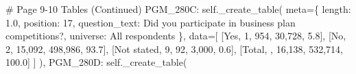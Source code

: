 \documentclass[
  11pt,
  a4paper,
]{article}
\newenvironment{Shaded}{\begin{snugshade}}{\end{snugshade}}
\newcommand{\CommentTok}[1]{\textcolor[rgb]{0.37,0.37,0.37}{#1}}
\newcommand{\NormalTok}[1]{\textcolor[rgb]{0.00,0.23,0.31}{#1}}
\newcommand{\OperatorTok}[1]{\textcolor[rgb]{0.37,0.37,0.37}{#1}}
\newcommand{\StringTok}[1]{\textcolor[rgb]{0.13,0.47,0.30}{#1}}
\newcommand{\VariableTok}[1]{\textcolor[rgb]{0.07,0.07,0.07}{#1}}
\begin{document}
\begin{Shaded}
\begin{Highlighting}[]
            \CommentTok{\# Page 9{-}10 Tables (Continued)}
            \StringTok{\textquotesingle{}PGM\_280C\textquotesingle{}}\NormalTok{: }\VariableTok{self}\NormalTok{.\_create\_table(}
\NormalTok{                meta}\OperatorTok{=}\NormalTok{\{}
                    \StringTok{\textquotesingle{}length\textquotesingle{}}\NormalTok{: }\StringTok{\textquotesingle{}1.0\textquotesingle{}}\NormalTok{, }\StringTok{\textquotesingle{}position\textquotesingle{}}\NormalTok{: }\StringTok{\textquotesingle{}17\textquotesingle{}}\NormalTok{,}
                    \StringTok{\textquotesingle{}question\_text\textquotesingle{}}\NormalTok{: }\StringTok{\textquotesingle{}Did you participate in business plan competitions?\textquotesingle{}}\NormalTok{,}
                    \StringTok{\textquotesingle{}universe\textquotesingle{}}\NormalTok{: }\StringTok{\textquotesingle{}All respondents\textquotesingle{}}
\NormalTok{                \},}
\NormalTok{                data}\OperatorTok{=}\NormalTok{[}
\NormalTok{                    [}\StringTok{\textquotesingle{}Yes\textquotesingle{}}\NormalTok{, }\StringTok{\textquotesingle{}1\textquotesingle{}}\NormalTok{, }\StringTok{\textquotesingle{}954\textquotesingle{}}\NormalTok{, }\StringTok{\textquotesingle{}30,728\textquotesingle{}}\NormalTok{, }\StringTok{\textquotesingle{}5.8\textquotesingle{}}\NormalTok{],}
\NormalTok{                    [}\StringTok{\textquotesingle{}No\textquotesingle{}}\NormalTok{, }\StringTok{\textquotesingle{}2\textquotesingle{}}\NormalTok{, }\StringTok{\textquotesingle{}15,092\textquotesingle{}}\NormalTok{, }\StringTok{\textquotesingle{}498,986\textquotesingle{}}\NormalTok{, }\StringTok{\textquotesingle{}93.7\textquotesingle{}}\NormalTok{],}
\NormalTok{                    [}\StringTok{\textquotesingle{}Not stated\textquotesingle{}}\NormalTok{, }\StringTok{\textquotesingle{}9\textquotesingle{}}\NormalTok{, }\StringTok{\textquotesingle{}92\textquotesingle{}}\NormalTok{, }\StringTok{\textquotesingle{}3,000\textquotesingle{}}\NormalTok{, }\StringTok{\textquotesingle{}0.6\textquotesingle{}}\NormalTok{],}
\NormalTok{                    [}\StringTok{\textquotesingle{}Total\textquotesingle{}}\NormalTok{, }\StringTok{\textquotesingle{}\textquotesingle{}}\NormalTok{, }\StringTok{\textquotesingle{}16,138\textquotesingle{}}\NormalTok{, }\StringTok{\textquotesingle{}532,714\textquotesingle{}}\NormalTok{, }\StringTok{\textquotesingle{}100.0\textquotesingle{}}\NormalTok{]}
\NormalTok{                ]}
\NormalTok{            ),}
            \StringTok{\textquotesingle{}PGM\_280D\textquotesingle{}}\NormalTok{: }\VariableTok{self}\NormalTok{.\_create\_table(}

\end{Highlighting}
\end{Shaded}
\end{document}
